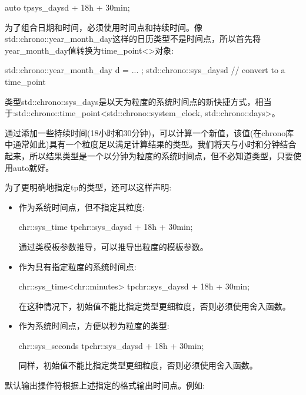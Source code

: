 \begin{cpp}
auto tp{sys_days{d} + 18h + 30min};
\end{cpp}

为了组合日期和时间，必须使用时间点和持续时间。像std::chrono::year\_month\_day这样的日历类型不是时间点，所以首先将year\_month\_day值转换为time\_point<>对象:

\begin{cpp}
std::chrono::year_month_day d = ... ;
std::chrono::sys_days{d} // convert to a time_point
\end{cpp}

类型std::chrono::sys\_days是以天为粒度的系统时间点的新快捷方式，相当于:std::chrono::time\_point<std::chrono::system\_clock, std::chrono::days>。

通过添加一些持续时间(18小时和30分钟)，可以计算一个新值，该值(在chrono库中通常如此)具有一个粒度足以满足计算结果的类型。我们将天与小时和分钟结合起来，所以结果类型是一个以分钟为粒度的系统时间点，但不必知道类型，只要使用auto就好。

为了更明确地指定tp的类型，还可以这样声明:

\begin{itemize}
\item 
作为系统时间点，但不指定其粒度:

\begin{cpp}
chr::sys_time tp{chr::sys_days{d} + 18h + 30min};
\end{cpp}

通过类模板参数推导，可以推导出粒度的模板参数。

\item
作为具有指定粒度的系统时间点:

\begin{cpp}
chr::sys_time<chr::minutes> tp{chr::sys_days{d} + 18h + 30min};
\end{cpp}

在这种情况下，初始值不能比指定类型更细粒度，否则必须使用舍入函数。

\item
作为系统时间点，方便以秒为粒度的类型:

\begin{cpp}
chr::sys_seconds tp{chr::sys_days{d} + 18h + 30min};
\end{cpp}

同样，初始值不能比指定类型更细粒度，否则必须使用舍入函数。
\end{itemize}

默认输出操作符根据上述指定的格式输出时间点。例如:

